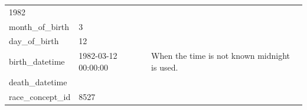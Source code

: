 \documentclass[11pt]{book}
\theoremstyle{definition}
\theoremstyle{definition}
\theoremstyle{definition}
\theoremstyle{remark}
\begin{document}
\begin{longtable}[]{@{}lll@{}}
\begin{minipage}[t]{0.15\columnwidth}
1982\strut
\end{minipage} & \begin{minipage}[t]{0.49\columnwidth}\raggedright
\strut
\end{minipage}\tabularnewline
\begin{minipage}[t]{0.28\columnwidth}\raggedright
month\_of\_birth\strut
\end{minipage} & \begin{minipage}[t]{0.15\columnwidth}\raggedright
3\strut
\end{minipage} & \begin{minipage}[t]{0.49\columnwidth}\raggedright
\strut
\end{minipage}\tabularnewline
\begin{minipage}[t]{0.28\columnwidth}\raggedright
day\_of\_birth\strut
\end{minipage} & \begin{minipage}[t]{0.15\columnwidth}\raggedright
12\strut
\end{minipage} & \begin{minipage}[t]{0.49\columnwidth}\raggedright
\strut
\end{minipage}\tabularnewline
\begin{minipage}[t]{0.28\columnwidth}\raggedright
birth\_datetime\strut
\end{minipage} & \begin{minipage}[t]{0.15\columnwidth}\raggedright
1982-03-12 00:00:00\strut
\end{minipage} & \begin{minipage}[t]{0.49\columnwidth}\raggedright
When the time is not known midnight is used.\strut
\end{minipage}\tabularnewline
\begin{minipage}[t]{0.28\columnwidth}\raggedright
death\_datetime\strut
\end{minipage} & \begin{minipage}[t]{0.15\columnwidth}\raggedright
\strut
\end{minipage} & \begin{minipage}[t]{0.49\columnwidth}\raggedright
\strut
\end{minipage}\tabularnewline
\begin{minipage}[t]{0.28\columnwidth}\raggedright
race\_concept\_id\strut
\end{minipage} & \begin{minipage}[t]{0.15\columnwidth}\raggedright
8527\strut
\end{minipage} & \begin{minipage}[t]{0.49\columnwidth}\raggedright

\end{minipage}
\end{longtable}
\end{document}
